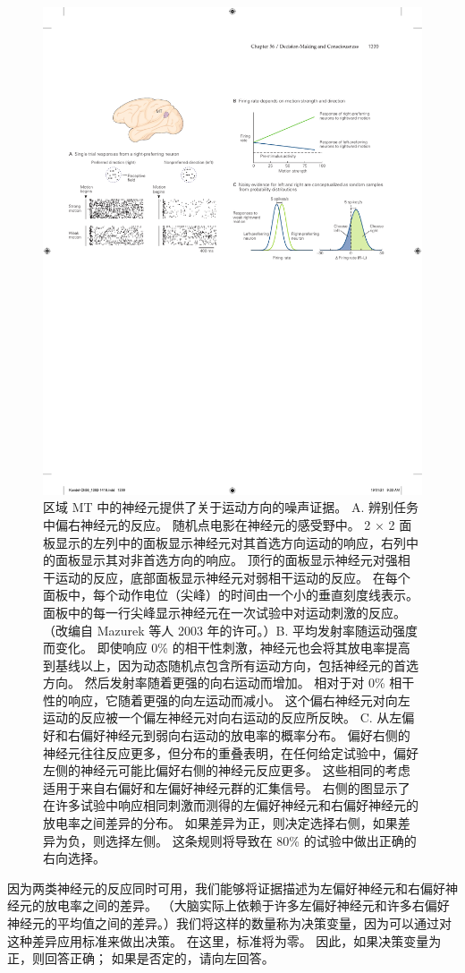 \begin{figure}[htbp]
	\centering
	\includegraphics[width=0.6\linewidth]{chap56/fig_56_4}
	\caption{区域 MT 中的神经元提供了关于运动方向的噪声证据。 A. 辨别任务中偏右神经元的反应。 随机点电影在神经元的感受野中。 2 × 2 面板显示的左列中的面板显示神经元对其首选方向运动的响应，右列中的面板显示其对非首选方向的响应。 顶行的面板显示神经元对强相干运动的反应，底部面板显示神经元对弱相干运动的反应。 在每个面板中，每个动作电位（尖峰）的时间由一个小的垂直刻度线表示。 面板中的每一行尖峰显示神经元在一次试验中对运动刺激的反应。 （改编自 Mazurek 等人 2003 年的许可。）B. 平均发射率随运动强度而变化。 即使响应 0\% 的相干性刺激，神经元也会将其放电率提高到基线以上，因为动态随机点包含所有运动方向，包括神经元的首选方向。 然后发射率随着更强的向右运动而增加。 相对于对 0\% 相干性的响应，它随着更强的向左运动而减小。 这个偏右神经元对向左运动的反应被一个偏左神经元对向右运动的反应所反映。 C. 从左偏好和右偏好神经元到弱向右运动的放电率的概率分布。 偏好右侧的神经元往往反应更多，但分布的重叠表明，在任何给定试验中，偏好左侧的神经元可能比偏好右侧的神经元反应更多。 这些相同的考虑适用于来自右偏好和左偏好神经元群的汇集信号。 右侧的图显示了在许多试验中响应相同刺激而测得的左偏好神经元和右偏好神经元的放电率之间差异的分布。 如果差异为正，则决定选择右侧，如果差异为负，则选择左侧。 这条规则将导致在 80\% 的试验中做出正确的右向选择。}
	\label{fig:56_4}
\end{figure}


因为两类神经元的反应同时可用，我们能够将证据描述为左偏好神经元和右偏好神经元的放电率之间的差异。
（大脑实际上依赖于许多左偏好神经元和许多右偏好神经元的平均值之间的差异。）我们将这样的数量称为决策变量，因为可以通过对这种差异应用标准来做出决策。
在这里，标准将为零。
因此，如果决策变量为正，则回答正确；
如果是否定的，请向左回答。


